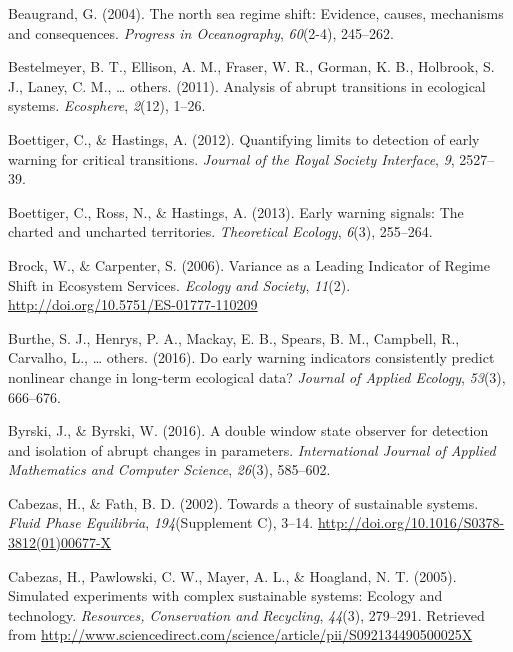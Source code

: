 \documentclass[12pt,twoside,openany]{reedthesis}
\begin{document}
\hypertarget{ref-beaugrand2004north}{}
Beaugrand, G. (2004). The north sea regime shift: Evidence, causes,
mechanisms and consequences. \emph{Progress in Oceanography},
\emph{60}(2-4), 245--262.

\hypertarget{ref-bestelmeyer_analysis_2011}{}
Bestelmeyer, B. T., Ellison, A. M., Fraser, W. R., Gorman, K. B.,
Holbrook, S. J., Laney, C. M., \ldots{} others. (2011). Analysis of
abrupt transitions in ecological systems. \emph{Ecosphere},
\emph{2}(12), 1--26.

\hypertarget{ref-boettiger_quantifying_2012}{}
Boettiger, C., \& Hastings, A. (2012). Quantifying limits to detection
of early warning for critical transitions. \emph{Journal of the Royal
Society Interface}, \emph{9}, 2527--39.

\hypertarget{ref-boettiger_early_2013}{}
Boettiger, C., Ross, N., \& Hastings, A. (2013). Early warning signals:
The charted and uncharted territories. \emph{Theoretical Ecology},
\emph{6}(3), 255--264.

\hypertarget{ref-brock_variance_2006}{}
Brock, W., \& Carpenter, S. (2006). Variance as a Leading Indicator of
Regime Shift in Ecosystem Services. \emph{Ecology and Society},
\emph{11}(2). \url{http://doi.org/10.5751/ES-01777-110209}

\hypertarget{ref-burthe2016early}{}
Burthe, S. J., Henrys, P. A., Mackay, E. B., Spears, B. M., Campbell,
R., Carvalho, L., \ldots{} others. (2016). Do early warning indicators
consistently predict nonlinear change in long-term ecological data?
\emph{Journal of Applied Ecology}, \emph{53}(3), 666--676.

\hypertarget{ref-byrski2016double}{}
Byrski, J., \& Byrski, W. (2016). A double window state observer for
detection and isolation of abrupt changes in parameters.
\emph{International Journal of Applied Mathematics and Computer
Science}, \emph{26}(3), 585--602.

\hypertarget{ref-cabezas_towards_2002}{}
Cabezas, H., \& Fath, B. D. (2002). Towards a theory of sustainable
systems. \emph{Fluid Phase Equilibria}, \emph{194}(Supplement C), 3--14.
\url{http://doi.org/10.1016/S0378-3812(01)00677-X}

\hypertarget{ref-cabezas_simulated_2005}{}
Cabezas, H., Pawlowski, C. W., Mayer, A. L., \& Hoagland, N. T. (2005).
Simulated experiments with complex sustainable systems: Ecology and
technology. \emph{Resources, Conservation and Recycling}, \emph{44}(3),
279--291. Retrieved from
\url{http://www.sciencedirect.com/science/article/pii/S092134490500025X}
\end{document}
